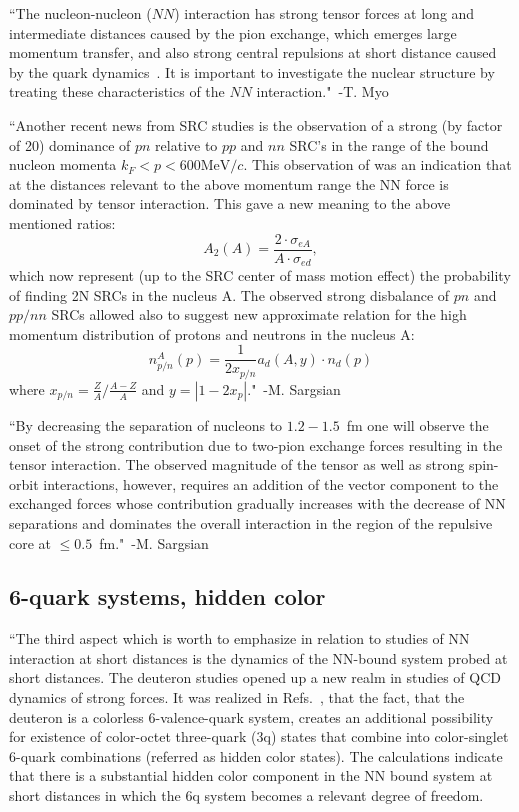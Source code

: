 ``The nucleon-nucleon ($NN$) interaction has strong tensor forces at long and intermediate distances caused by the pion exchange, which emerges large momentum transfer, and also strong central repulsions at short distance caused by the quark dynamics~\cite{Pieper:2001mp,Kamada:2001tv}. It is important to investigate the nuclear structure by treating these characteristics of the $NN$ interaction."~-T. Myo~\cite{Myo:2013dya}

``Another recent news from SRC studies is the observation of a strong (by factor of 20) dominance of $pn$ relative to $pp$ and $nn$ SRC's in the range of the bound nucleon momenta $k_F<p<600 \mathrm{MeV}/c$\cite{Piasetzky:2006ai,Subedi:2008zz}. This observation of was an indication that at the distances relevant to the above momentum range the NN force is dominated by tensor interaction. This gave a new meaning to the above mentioned ratios:
\begin{equation}
	A_2(A) = \frac{2\cdot \sigma_{eA}}{A\cdot \sigma_{ed}},
\end{equation}
which now represent (up to the SRC center of mass motion effect) the probability of finding 2N SRCs in the nucleus A. The observed strong disbalance of $pn$ and $pp/nn$ SRCs allowed also to suggest new approximate relation for the high momentum distribution of protons and neutrons in the nucleus A\cite{McGauley:2011qc}:
\begin{equation}
	n^A_{p/n}(p) = \frac{1}{2x_{p/n}}a_d(A,y)\cdot n_d(p)
\end{equation}
where $x_{p/n}=\frac{Z}{A}/\frac{A-Z}{A}$ and $y=\left| 1-2x_p\right|$."~-M. Sargsian~\cite{Sargsian:2012gj}


``By decreasing the separation of nucleons to $1.2-1.5$~fm one will observe the onset of the strong contribution due to two-pion exchange forces resulting in the tensor interaction. The observed magnitude of the tensor as well as strong spin-orbit interactions, however, requires an addition of the vector component to the exchanged forces whose contribution gradually increases with the decrease of NN separations and dominates the overall interaction in the region of the repulsive core at $\leq 0.5$~fm."~-M. Sargsian~\cite{Sargsian:2014bwa}


\subsection{6-quark systems, hidden color}

``The third aspect which is worth to emphasize in relation to studies of NN interaction at short distances is the dynamics of the NN-bound system probed at short distances. The deuteron studies opened up a new realm in studies of QCD dynamics of strong forces. It was realized in Refs.~\cite{Harvey:1980rva, Obukhovsky:1982ci, Brodsky:1985gu, Ji:1985ky,Kusainov:1991vn}, that the fact, that the deuteron is a colorless 6-valence-quark system, creates an additional possibility for existence of color-octet three-quark (3q) states that combine into color-singlet 6-quark combinations (referred as hidden color states). The calculations indicate that there is a substantial hidden color component in the NN bound system at short distances in which the 6q system becomes a relevant degree of freedom.

